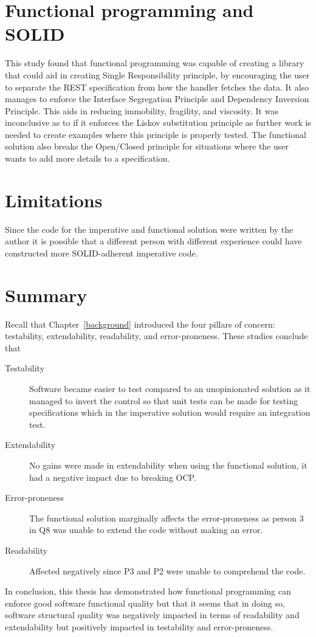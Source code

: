 \section{Functional programming and SOLID}

This study found that functional programming was capable of creating a library
that could aid in creating Single Responsibility principle, by encouraging the
user to separate the REST specification from how the handler fetches the data.
It also manages to enforce the Interface Segregation Principle and Dependency
Inversion Principle. This aids in reducing immobility, fragility, and viscosity.
It was inconclusive as to if it enforces the Liskov substitution principle as
further work is needed to create examples where this principle is properly
tested. The functional solution also breaks the Open/Closed principle for
situations where the user wants to add more details to a specification.


\section{Limitations}

Since the code for the imperative and functional solution were written by the
author it is possible that a different person with different experience could
have constructed more SOLID-adherent imperative code.

\section{Summary}

Recall that Chapter~\ref{background} introduced the four pillars of concern:
testability, extendability, readability, and error-proneness. These studies
conclude that

\begin{description}
    \item[Testability] Software became easier to test compared to an unopinionated
        solution as it managed to invert the control so that unit tests can be
        made for testing specifications which in the imperative solution would
        require an integration test.
	\item[Extendability] No gains were made in extendability when using the 
	functional solution, it had a negative impact due to breaking OCP.
    \item[Error-proneness] The functional solution marginally affects the
        error-proneness as person 3 in Q8 was unable to extend the
        code without making an error.
    \item[Readability] Affected negatively since P3 and P2 were unable to
        comprehend the code.
\end{description}

In conclusion, this thesis has demonstrated how functional programming can
enforce good software functional quality but that it seems that in doing so,
software structural quality was negatively impacted in terms of readability and
extendability but positively impacted in testability and error-proneness. 


